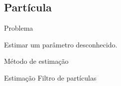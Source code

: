 \documentclass{beamer}
\begin{document}
\subsection*{Partícula}
\begin{frame}{Problema}
\noindent

 \begin{block}{}
  {\large Estimar um parâmetro desconhecido.}
\end{block}



\end{frame}

\begin{frame}{Método de estimação}
    \begin{block}{Estimação}
      \Huge  Filtro de partículas
    \end{block}

\end{frame}
\end{document}
